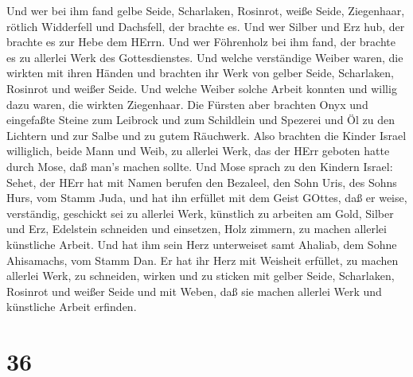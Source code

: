  Und wer bei ihm fand gelbe Seide, Scharlaken, Rosinrot,
weiße Seide, Ziegenhaar, rötlich Widderfell und Dachsfell, der brachte
es.  Und wer Silber und Erz hub, der brachte es zur Hebe
dem HErrn. Und wer Föhrenholz bei ihm fand, der brachte es zu allerlei
Werk des Gottesdienstes.  Und welche verständige Weiber
waren, die wirkten mit ihren Händen und brachten ihr Werk von gelber
Seide, Scharlaken, Rosinrot und weißer Seide.  Und welche
Weiber solche Arbeit konnten und willig dazu waren, die wirkten
Ziegenhaar.  Die Fürsten aber brachten Onyx und eingefaßte
Steine zum Leibrock und zum Schildlein  und Spezerei und Öl
zu den Lichtern und zur Salbe und zu gutem Räuchwerk.  Also
brachten die Kinder Israel williglich, beide Mann und Weib, zu allerlei
Werk, das der HErr geboten hatte durch Mose, daß man's machen sollte.
 Und Mose sprach zu den Kindern Israel: Sehet, der HErr hat
mit Namen berufen den Bezaleel, den Sohn Uris, des Sohns Hurs, vom Stamm
Juda,  und hat ihn erfüllet mit dem Geist GOttes, daß er
weise, verständig, geschickt sei zu allerlei Werk, 
künstlich zu arbeiten am Gold, Silber und Erz,  Edelstein
schneiden und einsetzen, Holz zimmern, zu machen allerlei künstliche
Arbeit.  Und hat ihm sein Herz unterweiset samt Ahaliab,
dem Sohne Ahisamachs, vom Stamm Dan.  Er hat ihr Herz mit
Weisheit erfüllet, zu machen allerlei Werk, zu schneiden, wirken und zu
sticken mit gelber Seide, Scharlaken, Rosinrot und weißer Seide und mit
Weben, daß sie machen allerlei Werk und künstliche Arbeit erfinden.

\hypertarget{section-35}{%
\section{36}\label{section-35}}

